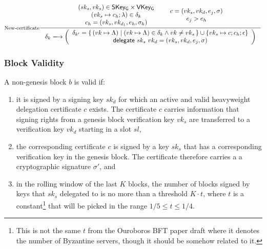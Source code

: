 \documentclass[11pt,a4paper]{article}
\newcommand\Set[2]{\{\,#1\mid#2\,\}}
\newcommand{\var}[1]{\mathit{#1}}
\newcommand{\fun}[1]{\mathsf{#1}}
\newcommand{\type}[1]{\mathsf{#1}}
\newcommand{\trans}[2]{\xlongrightarrow[\textsc{#1}]{#2}}
\newcommand{\SKeyGen}{\type{SKey_G}}
\newcommand{\VKeyGen}{\type{VKey_G}}
\newcommand{\delegatename}{delegate}
\newcommand{\delegate}[2]{\fun{\delegatename}\ #1 ~ #2}
\newcommand{\delmap}{\delta}
\newcommand{\partialf}{\mapsto}
\begin{document}
\begin{equation}
  \label{eq:new-del-cert}
  \inference[New-certificate]
  {
    {
      \begin{array}{c}
        (sk_s, vk_s) \in \SKeyGen \times \VKeyGen \\
        (vk_s \partialf c_h; \lambda) \in \delmap_k \\
        c_h = (vk_s, vk_{d_1}, e_h, \sigma_h)
      \end{array}
    }
    &
    {
      \begin{array}{c}
        c = (vk_s, vk_d, e_j, \sigma) \\
        e_j > e_h
      \end{array}
    }
  }
  {\delmap_k \trans{}{}
    \left(
    {
      \begin{array}{c}
        \delmap_{k'} = \Set{(vk \partialf \Lambda)}{(vk \partialf \Lambda) \in \delmap_k \wedge vk \neq vk_s} \cup \{vk_s \partialf c; c_h; \epsilon\} \\
        \delegate{sk_s}{vk_d} = (vk_s, vk_d, e_j, \sigma)
      \end{array}
    }
    \right)
  }
\end{equation}

\subsubsection{Block Validity}
\label{sec:block-valid}

A non-genesis block $\var{b}$ is valid if:
%
\begin{enumerate}
\item it is signed by a signing key $sk_d$ for which an active and valid
  heavyweight delegation certificate $c$ exists.
  The certificate $c$ carries information that signing rights from a genesis
  block verification key $vk_s$ are transferred to a verification key $vk_d$
  starting in a slot $sl$,
\item the corresponding certificate $c$ is signed by a key $sk_s$ that has a
  corresponding verification key in the genesis block.
  The certificate therefore carries a a cryptographic signature $\sigma'$,
  and
\item in the rolling window of the last $K$ blocks, the number of blocks
  signed by keys that $sk_s$ delegated to is no more than a threshold
  $K \cdot t$, where $t$ is a constant\footnote{This is not the same $t$ from
    the Ouroboros BFT paper draft where it denotes the number of Byzantine
    servers, though it should be somehow related to it.}  that will be picked
  in the range $1/5 \leq t \leq 1/4$.
\end{enumerate}
\end{document}
